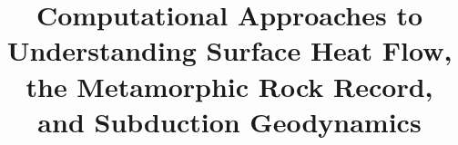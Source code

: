 \setlength{\emergencystretch}{3em}
\providecommand{\tightlist}{\setlength{\itemsep}{0pt}\setlength{\parskip}{0pt}}

  \newlength{\cslhangindent}
  \setlength{\cslhangindent}{1.5em}
  \newlength{\csllabelwidth}
  \setlength{\csllabelwidth}{3em}
  \newlength{\cslentryspacingunit} %
  \setlength{\cslentryspacingunit}{\parskip}
  \newenvironment{CSLReferences}[2] %
   {%
    \setlength{\parindent}{0pt}
    \ifodd #1
    \let\oldpar\par
    \def\par{\hangindent=\cslhangindent\oldpar}
    \fi
    \setlength{\parskip}{#2\cslentryspacingunit}
   }%
   {}
  \usepackage{calc}
  \newcommand{\CSLBlock}[1]{#1\hfill\break}
  \newcommand{\CSLLeftMargin}[1]{\parbox[t]{\csllabelwidth}{#1}}
  \newcommand{\CSLRightInline}[1]{\parbox[t]{\linewidth - \csllabelwidth}{#1}\break}
  \newcommand{\CSLIndent}[1]{\hspace{\cslhangindent}#1}


  \usepackage[]{natbib}
  


\usepackage[bookmarks=true,pageanchor=false]{hyperref}
\usepackage{xurl} %
\usepackage{bookmark}

\usepackage[nonumberlist,acronym,toc]{glossaries-extra}
  \makeglossaries

\usepackage[noprefix,intoc]{nomencl}
  \makenomenclature
  



  \title{Computational Approaches to Understanding Surface Heat Flow, the Metamorphic Rock Record, and Subduction Geodynamics}

